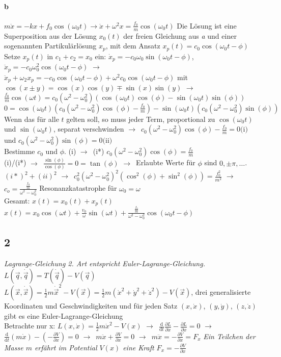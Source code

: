 \documentclass[oneside]{book}
\theoremstyle{definition}
\newcommand{\conseq}{$\rightarrow$~}
\renewcommand{\d}{\mathrm d}
\newcommand{\dd}[1]{\frac{\d}{\d #1}}
\newcommand{\ffpartial}[2]{\frac{\partial #1}{\partial #2}}
\newcommand{\dotvec}[1]{\dot{\vec{#1}}}
\begin{document}
\paragraph{b}
$m \ddot{x} = -kx + f_0 \cos(\omega_0 t) \rightarrow \ddot{x} + \omega^2 x = \frac{f_0}{m} \cos(\omega_0 t)$
	Die Lösung ist eine Superposition aus der Lösung $x_0(t)$ der freien Gleichung aus \textit{a} und einer sogenannten Partikulärlösung $x_p$, mit dem Ansatz $x_p(t) = c_0 \cos(\omega_0 t - \phi)$
	\\Setze $x_p(t)$ in  $c_1 + c_2 = x_0$ ein: $\dot{x}_p = - c_0 \omega_0 \sin(\omega_0 t - \phi)$, $\ddot{x}_p = - c_0 \omega_0^2 \cos(\omega_0 t - \phi)$
	\conseq $\ddot{x}_p + \omega_2 x_p = - c_0 \cos(\omega_0 t - \phi) + \omega^2 c_0 \cos(\omega_0 t - \phi)$
	mit $\cos(x \pm y) = \cos(x)\cos(y) \mp \sin(x)\sin(y)$
	\conseq $\frac{f_0}{m} \cos(\omega t) = c_0 (\omega^2 - \omega_0^2) (\cos(\omega_0 t) \cos(\phi) - \sin(\omega_0 t)\sin(\phi))$
	$0 = \cos(\omega_0 t)(c_0 (\omega^2 - \omega_0^2)\cos(\phi) - \frac{f_0}{m}) - \sin(\omega_0 t)(c_0 (\omega^2 - \omega_0^2) \sin(\phi))$
	\\ Wenn das für alle $t$ gelten soll, so muss jeder Term, proportional zu $\cos(\omega_0 t)$ und $\sin(\omega_0 t)$, separat verschwinden \conseq $c_0 (\omega^2 - \omega_0^2) \cos(\phi) - \frac{f_0}{m} = 0 \text{(i)}$ und $c_0 (\omega^2 - \omega_0^2) \sin(\phi) = 0 \text{(ii)}$\\
	Bestimme $c_0$ und $\phi$.
	(i) \conseq (i*) $c_0 (\omega^2 - \omega_0^2) \cos(\phi) = \frac{f_0}{m}$\\
	(i)/(i*) \conseq $\frac{\sin(\phi)}{\cos(\phi)} = 0 = \tan (\phi)$
	\conseq Erlaubte Werte für $\phi$ sind $0, \pm \pi, \dots$.\\
	$(i*)^2 + (ii)^2$ \conseq $c_0^2 (\omega^2 - \omega_0^2)^2 (\cos^2(\phi) + \sin^2(\phi)) = \frac{f_0^2}{m^2}$ \conseq $c_o = \frac{\frac{f_0}{m}}{\omega^2 - \omega_0^2}$ Resonanzkatastrophe für $\omega_0 = \omega$\\
Gesamt: $x(t) = x_0(t) + x_p(t)$\\
$x(t) = x_0 \cos(\omega t) + \frac{v_0}{\omega} \sin(\omega t) + \frac{\frac{f_0}{m}}{\omega^2 - \omega_0^2} \cos (\omega_0 t - \phi)$

\subsection{2}
\textit{Lagrange-Gleichung 2. Art entspricht Euler-Lagrange-Gleichung.}
$L(\vec q, \dotvec{q}) = T(\dotvec{q}) - V(\vec{q})$\\
$L(\vec{x}, \dotvec{x}) = \frac12 m \dotvec{x}^2 - V(\vec{x}) = \frac12 m (\dot{x}^2 + \dot{y}^2 + \dot{z}^2) - V(\vec{x})$, drei generalisierte Koordinaten und Geschwindigkeiten und für jeden Satz $(x, \dot x)$, $(y, \dot y)$, $(z, \dot z)$ gibt es eine Euler-Lagrange-Gleichung\\
Betrachte nur x: $L(x, \dot x) = \frac12 m \dot{x}^2 - V(x)$
\conseq $\dd t \ffpartial{L}{\dot{x}} - \ffpartial{L}{x} = 0$ \conseq $\dd t (m \dot x) - (- \ffpartial{V}{x}) = 0$ \conseq $m \ddot x + \ffpartial{V}{x} = 0$ \conseq $m \ddot x = - \ffpartial{V}{x} = F_x$ \textit{Ein Teilchen der Masse $m$ erfährt im Potential $V(x)$ eine Kraft $F_x = -\ffpartial{V}{x}$}
\end{document}

